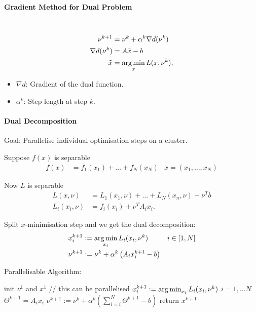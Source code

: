 \paragraph{Gradient Method for Dual Problem}\
\begin{align*}
    \nu^{k+1} &= \nu^k +\alpha^k\nabla d(\nu^k)\\
    \nabla d(\nu^k) &= A\tilde x-b\\
    \tilde x &= \operatorname*{arg\,min}_x L(x,\nu^k),
\end{align*}
\begin{itemize}
    \item $\nabla d$: Gradient of the dual function.
    \item $\alpha^k$: Step length at step $k$.
\end{itemize}

\paragraph{Dual Decomposition}
Goal: Parallelise individual optimisation steps on a cluster. 
\begin{description}
\item Suppose $f(x)$ is separable
    \begin{align*}
         f(x) &= f_1(x_1) + \ldots + f_N(x_N) &x=(x_1,\ldots, x_N)
    \end{align*}
\item Now $L$ is separable
    \begin{align*}
        L(x,\nu) &= L_1(x_1,\nu) + \ldots + L_N (x_n,\nu) - \nu^T b\\
        L_i(x_i,\nu) &= f_i(x_i) + \nu^T A_ix_i.
    \end{align*}
\item Split $x$-minimisation step and we get the dual decomposition:
    \begin{align*}
        x_i^{k+1} &:= \operatorname*{arg\,min}_{x_i} L_i (x_i,\nu^k) &i\in[1,N]\\
        \nu^{k+1} &:= \nu^k + \alpha^k 
            \left(
                A_i x_i^{k+1} -b
            \right)
    \end{align*}
\item Parallelisable Algorithm:
    \begin{algorithmic}
        \STATE init $\nu^1$ and $x^1$
                \STATE // this can be parallelised
                \STATE $x_i^{k+1} :=\operatorname*{arg\,min}_{x_i} L_i(x_i,\nu^k)$ $i=1,\ldots N$
                \STATE $\Theta^{k+1} = A_i x_i$
            \ENDFOR
            \STATE $\nu^{k+1} := \nu^k +\alpha^k \left(\sum_{i=i}^N \Theta^{k+1} -b\right)$ 
        \ENDFOR
        \STATE return $x^{k+1}$
    \end{algorithmic}
    
\end{description}

